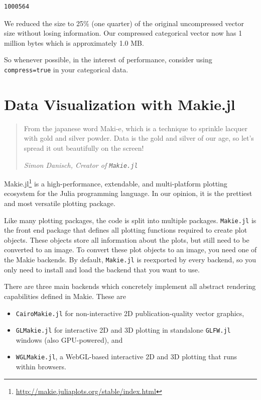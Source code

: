 \documentclass[
  notoc %
]{tufte-book}
\DeclareRobustCommand{\href}[2]{#2\footnote{\url{#1}}}
\providecommand{\tightlist}{%
  \setlength{\itemsep}{0pt}\setlength{\parskip}{0pt}
}
\newcommand{\passthrough}[1]{#1}
\begin{document}
\begin{lstlisting}
1000564
\end{lstlisting}

We reduced the size to 25\% (one quarter) of the original uncompressed
vector size without losing information. Our compressed categorical
vector now has 1 million bytes which is approximately 1.0 MB.

So whenever possible, in the interest of performance, consider using
\passthrough{\lstinline!compress=true!} in your categorical data.

\hypertarget{sec:DataVisualizationMakie}{%
\chapter{Data Visualization with
Makie.jl}\label{sec:DataVisualizationMakie}}

\begin{quote}
From the japanese word Maki-e, which is a technique to sprinkle lacquer
with gold and silver powder. Data is the gold and silver of our age, so
let's spread it out beautifully on the screen!

\emph{Simon Danisch, Creator of \passthrough{\lstinline!Makie.jl!}}
\end{quote}

\href{http://makie.juliaplots.org/stable/index.html}{Makie.jl} is a
high-performance, extendable, and multi-platform plotting ecosystem for
the Julia programming language. In our opinion, it is the prettiest and
most versatile plotting package.

Like many plotting packages, the code is split into multiple packages.
\passthrough{\lstinline!Makie.jl!} is the front end package that defines
all plotting functions required to create plot objects. These objects
store all information about the plots, but still need to be converted to
an image. To convert these plot objects to an image, you need one of the
Makie backends. By default, \passthrough{\lstinline!Makie.jl!} is
reexported by every backend, so you only need to install and load the
backend that you want to use.

There are three main backends which concretely implement all abstract
rendering capabilities defined in Makie. These are

\begin{itemize}
\tightlist
\item
  \passthrough{\lstinline!CairoMakie.jl!} for non-interactive 2D
  publication-quality vector graphics,
\item
  \passthrough{\lstinline!GLMakie.jl!} for interactive 2D and 3D
  plotting in standalone \passthrough{\lstinline!GLFW.jl!} windows (also
  GPU-powered), and
\item
  \passthrough{\lstinline!WGLMakie.jl!}, a WebGL-based interactive 2D
  and 3D plotting that runs within browsers.
\end{itemize}
\end{document}
